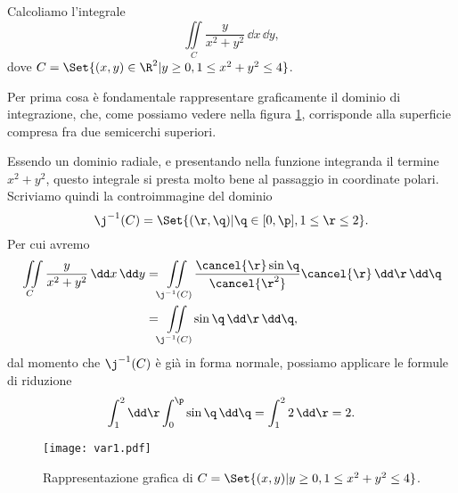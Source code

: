 \begin{ese}
	Calcoliamo l'integrale
	\[
		\iint\limits_C \frac{y}{x^2+y^2}\,\dd x\,\dd y,
	\]
	dove \(C=\Set{(x,y)\in\R^2 | y\ge 0, 1 \le x^2+y^2 \le 4}\).

	Per prima cosa è fondamentale rappresentare graficamente il dominio di integrazione, che, come possiamo vedere nella figura \ref{fig:var1}, corrisponde alla superficie compresa fra due semicerchi superiori.

	Essendo un dominio radiale, e presentando nella funzione integranda il termine \(x^2+y^2\), questo integrale si presta molto bene al passaggio in coordinate polari.
	Scriviamo quindi la controimmagine del dominio
	\[
		\j^{-1}(C) = \Set{(\r,\q) | \q\in[0,\p], 1 \le \r \le 2}.
	\]
	Per cui avremo
	\[
		\begin{split}
			\iint\limits_C \frac{y}{x^2+y^2}\,\dd x\,\dd y & = \iint\limits_{\j^{-1}(C)} \frac{\cancel{\r}\sin\q}{\cancel{\r^2}}\cancel{\r}\,\dd\r\,\dd\q\\
			& = \iint\limits_{\j^{-1}(C)}\sin\q\,\dd\r\,\dd\q,
		\end{split}
	\]
	dal momento che \(\j^{-1}(C)\) è già in forma normale, possiamo applicare le formule di riduzione
	\[
		\int_1^2 \dd\r \int_0^\p \sin\q \,\dd\q = \int_1^2 2\,\dd\r = 2.
	\]
\end{ese}

\begin{figure}[tp]
	\begin{centering}
		\texttt{[image: var1.pdf]}
		\caption{Rappresentazione grafica di \(C=\Set{(x,y) | y\ge0, 1\le x^2+y^2\le 4}\).}
		\label{fig:var1}
	\end{centering}
\end{figure}

